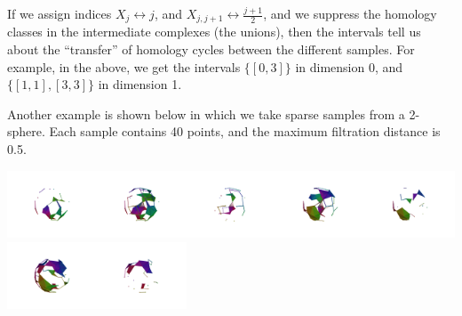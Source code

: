 \documentclass[10pt]{amsart}
\begin{document}
If we assign indices $X_j \leftrightarrow j$, and $X_{j, j+1} \leftrightarrow \frac{j+1}{2}$, and we suppress the homology classes in the intermediate complexes (the unions), then the intervals tell us about the ``transfer'' of homology cycles between the different samples. For example, in the above, we get the intervals $\{[0, 3]\}$ in dimension 0, and $\{[1, 1], [3, 3]\}$ in dimension 1.

Another example is shown below in which we take sparse samples from a 2-sphere. Each sample contains 40 points, and the maximum filtration distance is 0.5.

\vspace{0.5cm}
\hspace{-1.5cm}\includegraphics[height=2cm]{sphere-vietoris-rips-0.png}\includegraphics[height=2cm]{sphere-vietoris-rips-01.png}\includegraphics[height=2cm]{sphere-vietoris-rips-1.png}\includegraphics[height=2cm]{sphere-vietoris-rips-12.png}\includegraphics[height=2cm]{sphere-vietoris-rips-2.png}\includegraphics[height=2cm]{sphere-vietoris-rips-23.png}\includegraphics[height=2cm]{sphere-vietoris-rips-3.png}
\vspace{0.5cm}
\end{document}
